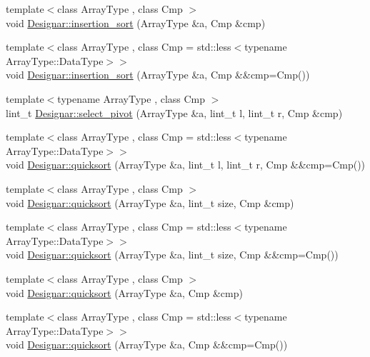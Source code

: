 \begin{DoxyCompactItemize}
\item 
{\footnotesize template$<$class Array\+Type , class Cmp $>$ }\\void \hyperlink{namespace_designar_ab78e23e3c8eb0365e27244f5de2532d2}{Designar\+::insertion\+\_\+sort} (Array\+Type \&a, Cmp \&cmp)
\item 
{\footnotesize template$<$class Array\+Type , class Cmp  = std\+::less$<$typename Array\+Type\+::\+Data\+Type$>$$>$ }\\void \hyperlink{namespace_designar_a93966614af4a5a6c0bd78fe75af5e7cf}{Designar\+::insertion\+\_\+sort} (Array\+Type \&a, Cmp \&\&cmp=Cmp())
\item 
{\footnotesize template$<$typename Array\+Type , class Cmp $>$ }\\lint\+\_\+t \hyperlink{namespace_designar_ac3674dae50d8d382e25a5fce8775294c}{Designar\+::select\+\_\+pivot} (Array\+Type \&a, lint\+\_\+t l, lint\+\_\+t r, Cmp \&cmp)
\item 
{\footnotesize template$<$class Array\+Type , class Cmp  = std\+::less$<$typename Array\+Type\+::\+Data\+Type$>$$>$ }\\void \hyperlink{namespace_designar_af359499060a9d2b8e282ae9def049e17}{Designar\+::quicksort} (Array\+Type \&a, lint\+\_\+t l, lint\+\_\+t r, Cmp \&\&cmp=Cmp())
\item 
{\footnotesize template$<$class Array\+Type , class Cmp $>$ }\\void \hyperlink{namespace_designar_a4887d9486cdfcd7e021047915ae26651}{Designar\+::quicksort} (Array\+Type \&a, lint\+\_\+t size, Cmp \&cmp)
\item 
{\footnotesize template$<$class Array\+Type , class Cmp  = std\+::less$<$typename Array\+Type\+::\+Data\+Type$>$$>$ }\\void \hyperlink{namespace_designar_a3b84da2b14868b20993ec9687e3c29c4}{Designar\+::quicksort} (Array\+Type \&a, lint\+\_\+t size, Cmp \&\&cmp=Cmp())
\item 
{\footnotesize template$<$class Array\+Type , class Cmp $>$ }\\void \hyperlink{namespace_designar_ae6156420cc82f38302cc7b7c837275b1}{Designar\+::quicksort} (Array\+Type \&a, Cmp \&cmp)
\item 
{\footnotesize template$<$class Array\+Type , class Cmp  = std\+::less$<$typename Array\+Type\+::\+Data\+Type$>$$>$ }\\void \hyperlink{namespace_designar_a75b9270f723888eb32e0b8f78032f0df}{Designar\+::quicksort} (Array\+Type \&a, Cmp \&\&cmp=Cmp())
\end{DoxyCompactItemize}


